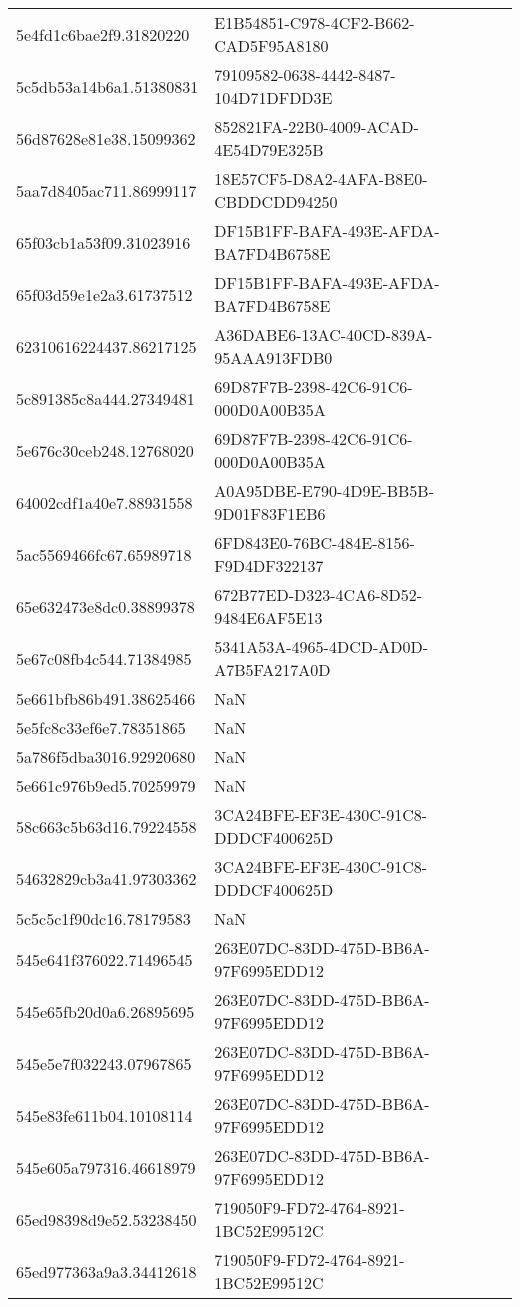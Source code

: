 \begin{tabular}{ll}
5e4fd1c6bae2f9.31820220 & E1B54851-C978-4CF2-B662-CAD5F95A8180 \\
5c5db53a14b6a1.51380831 & 79109582-0638-4442-8487-104D71DFDD3E \\
56d87628e81e38.15099362 & 852821FA-22B0-4009-ACAD-4E54D79E325B \\
5aa7d8405ac711.86999117 & 18E57CF5-D8A2-4AFA-B8E0-CBDDCDD94250 \\
65f03cb1a53f09.31023916 & DF15B1FF-BAFA-493E-AFDA-BA7FD4B6758E \\
65f03d59e1e2a3.61737512 & DF15B1FF-BAFA-493E-AFDA-BA7FD4B6758E \\
62310616224437.86217125 & A36DABE6-13AC-40CD-839A-95AAA913FDB0 \\
5c891385c8a444.27349481 & 69D87F7B-2398-42C6-91C6-000D0A00B35A \\
5e676c30ceb248.12768020 & 69D87F7B-2398-42C6-91C6-000D0A00B35A \\
64002cdf1a40e7.88931558 & A0A95DBE-E790-4D9E-BB5B-9D01F83F1EB6 \\
5ac5569466fc67.65989718 & 6FD843E0-76BC-484E-8156-F9D4DF322137 \\
65e632473e8dc0.38899378 & 672B77ED-D323-4CA6-8D52-9484E6AF5E13 \\
5e67c08fb4c544.71384985 & 5341A53A-4965-4DCD-AD0D-A7B5FA217A0D \\
5e661bfb86b491.38625466 & NaN \\
5e5fc8c33ef6e7.78351865 & NaN \\
5a786f5dba3016.92920680 & NaN \\
5e661c976b9ed5.70259979 & NaN \\
58c663c5b63d16.79224558 & 3CA24BFE-EF3E-430C-91C8-DDDCF400625D \\
54632829cb3a41.97303362 & 3CA24BFE-EF3E-430C-91C8-DDDCF400625D \\
5c5c5c1f90dc16.78179583 & NaN \\
545e641f376022.71496545 & 263E07DC-83DD-475D-BB6A-97F6995EDD12 \\
545e65fb20d0a6.26895695 & 263E07DC-83DD-475D-BB6A-97F6995EDD12 \\
545e5e7f032243.07967865 & 263E07DC-83DD-475D-BB6A-97F6995EDD12 \\
545e83fe611b04.10108114 & 263E07DC-83DD-475D-BB6A-97F6995EDD12 \\
545e605a797316.46618979 & 263E07DC-83DD-475D-BB6A-97F6995EDD12 \\
65ed98398d9e52.53238450 & 719050F9-FD72-4764-8921-1BC52E99512C \\
65ed977363a9a3.34412618 & 719050F9-FD72-4764-8921-1BC52E99512C \\

\end{tabular}
